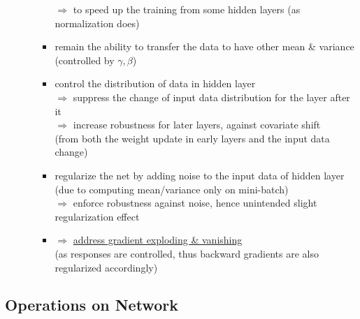 \begin{itemize}
\begin{itemize}
\begin{itemize}
		$\Rightarrow$ to speed up the training from some hidden layers (as normalization does)
		\item remain the ability to transfer the data to have other mean \& variance \\
		(controlled by $\gamma,\beta$)
		\item control the distribution of data in hidden layer \\ 
		$\Rightarrow$ suppress the change of input data distribution for the layer after it \\
		$\Rightarrow$ increase robustness for later layers, against covariate shift \\ 
		(from both the weight update in early layers and the input data change)
		\item regularize the net by adding noise to the input data of hidden layer \\ 
		(due to computing mean/variance only on mini-batch) \\
		$\Rightarrow$ enforce robustness against noise, hence unintended slight regularization effect
		\item $\Rightarrow$ \underline{address gradient exploding \& vanishing} \\
		(as responses are controlled, thus backward gradients are also regularized accordingly)
		\end{itemize}
	\end{itemize}
\end{itemize}

\subsection{Operations on Network}
